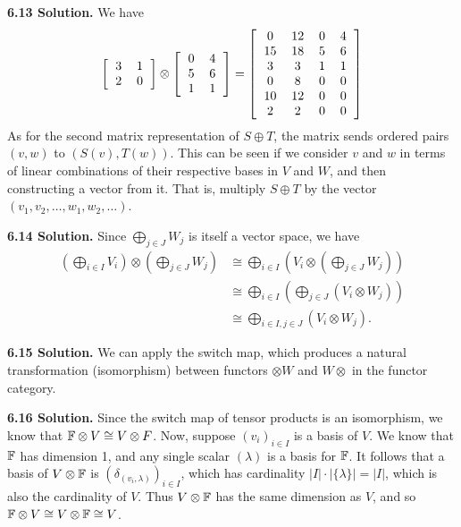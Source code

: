 \textbf{6.13 Solution.} We have
\[
\left[\begin{tabular}{cc}
    3 & 1 \\
    2 & 0
\end{tabular}\right]
\otimes
\left[\begin{tabular}{cc}
    0 & 4 \\
    5 & 6 \\
    1 & 1
\end{tabular}\right]
=
\left[\begin{tabular}{cccc}
    0 & 12 & 0 & 4 \\
    15 & 18 & 5 & 6 \\
    3 & 3 & 1 & 1 \\
    0 & 8 & 0 & 0 \\
    10 & 12 & 0 & 0 \\
    2 & 2 & 0 & 0
\end{tabular}\right]
\]
As for the second matrix representation of $S \oplus T$, the matrix sends ordered pairs $(v, w)$ to $(S(v), T(w))$. This can be seen if we consider $v$ and $w$ in terms of linear combinations of their respective bases in $V$ and $W$, and then constructing a vector from it. That is, multiply $S \oplus T$ by the vector $(v_1, v_2, \dots , w_1, w_2, \dots)$.

\textbf{6.14 Solution.} Since $\bigoplus_{j \in J}W_j$ is itself a vector space, we have
\begin{align*}
\left(\bigoplus_{i \in I}V_i\right) \otimes \left(\bigoplus_{j \in J}W_j\right) &\cong
\bigoplus_{i \in I}\left(V_i \otimes \left(\bigoplus_{j \in J}W_j\right)\right) \\
&\cong \bigoplus_{i \in I}\left(\bigoplus_{j \in J}(V_i \otimes W_j)\right) \\
&\cong \bigoplus_{i \in I, j \in J} (V_i \otimes W_j).
\end{align*}

\textbf{6.15 Solution.} We can apply the switch map, which produces a natural transformation (isomorphism) between functors $\otimes W$ and $W \otimes$ in the functor category.

\textbf{6.16 Solution.} Since the switch map of tensor products is an isomorphism, we know that $\mathbb{F} \otimes V \cong V \otimes F$. Now, suppose $(v_i)_{i \in I}$ is a basis of $V$. We know that $\mathbb{F}$ has dimension 1, and any single scalar $(\lambda)$ is a basis for $\mathbb{F}$. It follows that a basis of $V \otimes \mathbb{F}$ is $(\delta_{(v_i, \lambda)})_{i \in I}$, which has cardinality $|I| \cdot |\{\lambda\}| = |I|$, which is also the cardinality of $V$. Thus $V \otimes \mathbb{F}$ has the same dimension as $V$, and so $\mathbb{F} \otimes V \cong V \otimes \mathbb{F} \cong V$.

